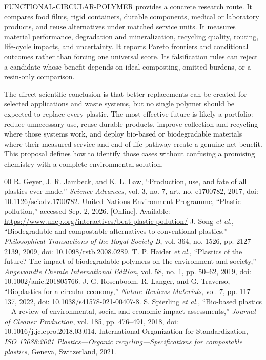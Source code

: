 \documentclass[conference]{IEEEtran}
\begin{document}
FUNCTIONAL-CIRCULAR-POLYMER provides a concrete research route. It compares food films, rigid containers, durable components, medical or laboratory products, and reuse alternatives under matched service units. It measures material performance, degradation and mineralization, recycling quality, routing, life-cycle impacts, and uncertainty. It reports Pareto frontiers and conditional outcomes rather than forcing one universal score. Its falsification rules can reject a candidate whose benefit depends on ideal composting, omitted burdens, or a resin-only comparison.

The direct scientific conclusion is that better replacements can be created for selected applications and waste systems, but no single polymer should be expected to replace every plastic. The most effective future is likely a portfolio: reduce unnecessary use, reuse durable products, improve collection and recycling where those systems work, and deploy bio-based or biodegradable materials where their measured service and end-of-life pathway create a genuine net benefit. This proposal defines how to identify those cases without confusing a promising chemistry with a complete environmental solution.

\begin{thebibliography}{00}
 R. Geyer, J. R. Jambeck, and K. L. Law, ``Production, use, and fate of all plastics ever made,'' \textit{Science Advances}, vol. 3, no. 7, art. no. e1700782, 2017, doi: 10.1126/sciadv.1700782.
 United Nations Environment Programme, ``Plastic pollution,'' accessed Sep. 2, 2026. [Online]. Available: \url{https://www.unep.org/interactives/beat-plastic-pollution/}
 J. Song \textit{et al.}, ``Biodegradable and compostable alternatives to conventional plastics,'' \textit{Philosophical Transactions of the Royal Society B}, vol. 364, no. 1526, pp. 2127--2139, 2009, doi: 10.1098/rstb.2008.0289.
 T. P. Haider \textit{et al.}, ``Plastics of the future? The impact of biodegradable polymers on the environment and society,'' \textit{Angewandte Chemie International Edition}, vol. 58, no. 1, pp. 50--62, 2019, doi: 10.1002/anie.201805766.
 J.-G. Rosenboom, R. Langer, and G. Traverso, ``Bioplastics for a circular economy,'' \textit{Nature Reviews Materials}, vol. 7, pp. 117--137, 2022, doi: 10.1038/s41578-021-00407-8.
 S. Spierling \textit{et al.}, ``Bio-based plastics---A review of environmental, social and economic impact assessments,'' \textit{Journal of Cleaner Production}, vol. 185, pp. 476--491, 2018, doi: 10.1016/j.jclepro.2018.03.014.
 International Organization for Standardization, \textit{ISO 17088:2021 Plastics---Organic recycling---Specifications for compostable plastics}, Geneva, Switzerland, 2021.
\end{thebibliography}
\end{document}
